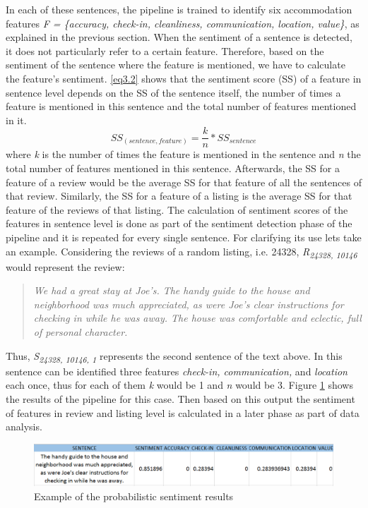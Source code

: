 In each of these sentences, the pipeline is trained to identify six accommodation features \textit{F = \{accuracy, check-in, cleanliness, communication, location, value\}}, as explained in the previous section. When the sentiment of a sentence is detected, it does not particularly refer to a certain feature. Therefore, based on the sentiment of the sentence where the feature is mentioned, we have to calculate the feature's sentiment.
\ref{eq3.2} shows that the sentiment score (SS) of a feature in sentence level depends on the SS of the sentence itself, the number of times a feature is mentioned in this sentence and the total number of features mentioned in it.
%
%
\begin{equation}
SS_{(sentence,feature)} = \frac{k}{n} * SS_{sentence}
\label{eq3.2}
\end{equation}
where \textit{k} is the number of times the feature is mentioned in the sentence and \textit{n} the total number of features mentioned in this sentence. Afterwards, the SS for a feature of a review would be the average SS for that feature of all the sentences of that review. Similarly, the SS for a feature of a listing is the average SS for that feature of the reviews of that listing.
The calculation of sentiment scores of the features in sentence level is done as part of the sentiment detection phase of the pipeline and it is repeated for every single sentence. For clarifying its use lets take an example. Considering the reviews of a random listing, i.e. 24328,  \textit{R\textsubscript{24328, 10146}} would represent the review:
\begin{quote}
\textit{We had a great stay at Joe's. The handy guide to the house and neighborhood was much appreciated, as were Joe's clear instructions for checking in while he was away. The house was comfortable and eclectic, full of personal character.}
\end{quote}
Thus, \textit{S\textsubscript{24328, 10146, 1}} represents the second sentence of the text above. In this sentence can be identified three features \textit{check-in, communication,} and \textit{location} each once, thus for each of them \textit{k} would be 1 and \textit{n} would be 3. Figure \ref{fig:sent} shows the results of the pipeline for this case. Then based on this output the sentiment of features in review and listing level is calculated in a later phase as part of data analysis.
\begin{figure}[h!]
	\centering
	\includegraphics[height=0.1\textheight]{example_pip}
	\caption{Example of the probabilistic sentiment results}
	\label{fig:sent}
\end{figure}
%

